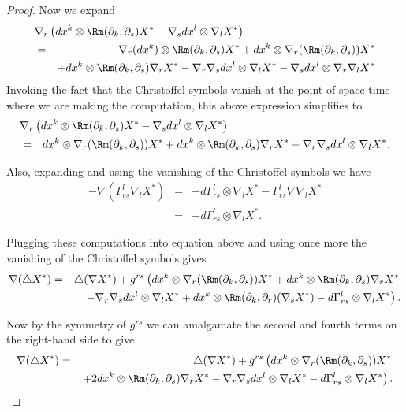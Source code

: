 \begin{proof}
Now we expand
\begin{eqnarray*}
\lefteqn{\nabla_r\left(dx^k\otimes \Rm(\partial_k,\partial_s)X^*-\nabla_sdx^l\otimes
\nabla_lX^*\right)}
\\ & = & \nabla_r(dx^k)\otimes
\Rm(\partial_k,\partial_s)X^*+dx^k\otimes\nabla_r(\Rm(\partial_k,\partial_s))X^*
\\
& & + dx^k\otimes \Rm(\partial_k,\partial_s)\nabla_rX^*-\nabla_r\nabla_sdx^l\otimes\nabla_lX^*-\nabla_sdx^l\otimes
\nabla_r\nabla_lX^*
\end{eqnarray*}
Invoking the fact that the Christoffel symbols vanish at the point
of space-time where we are making the computation, this above
expression simplifies to
\begin{eqnarray*}
\lefteqn{\nabla_r\left(dx^k\otimes \Rm(\partial_k,\partial_s)X^*-\nabla_sdx^l\otimes
\nabla_lX^*\right)}
\\ & = & dx^k\otimes\nabla_r(\Rm(\partial_k,\partial_s))X^* + dx^k\otimes
\Rm(\partial_k,\partial_s)\nabla_rX^*-\nabla_r\nabla_sdx^l\otimes\nabla_lX^*.
\end{eqnarray*}

Also, expanding and using the vanishing of the Christoffel symbols
we have
\begin{eqnarray*}
-\nabla(\Gamma_{rs}^l\nabla_lX^*)& = &
-d\Gamma_{rs}^l\otimes\nabla_lX^*-\Gamma_{rs}^l\nabla\nabla_lX^* \\
& = & -d\Gamma_{rs}^l\otimes\nabla_lX^*.
\end{eqnarray*}



Plugging these computations into equation above and using once more the
vanishing of the Christoffel symbols gives
\begin{eqnarray*}
\nabla(\triangle X^*) & = & \triangle(\nabla X^*)+g^{rs}\left(
dx^k\otimes\nabla_r(\Rm(\partial_k,\partial_s))X^* +
dx^k\otimes
\Rm(\partial_k,\partial_s)\nabla_rX^* \right.\\
& & \left.
  -\nabla_r\nabla_sdx^l\otimes\nabla_lX^* +dx^k\otimes
\Rm(\partial_k,\partial_r)(\nabla_sX^*)
 -d\Gamma_{rs}^l\otimes\nabla_lX^*\right).
\end{eqnarray*}

 Now by the symmetry of $g^{rs}$ we can amalgamate the second and
 fourth terms on the right-hand side to give
\begin{eqnarray*}
\nabla(\triangle X^*) & = & \triangle(\nabla X^*)+g^{rs}\left(
dx^k\otimes\nabla_r(\Rm(\partial_k,\partial_s))X^* \right. \\
 & & \left. + 2dx^k\otimes
\Rm(\partial_k,\partial_s)\nabla_rX^*
-\nabla_r\nabla_sdx^l\otimes\nabla_lX^*
 -d\Gamma_{rs}^l\otimes\nabla_lX^*\right).
\end{eqnarray*}



\end{proof}
